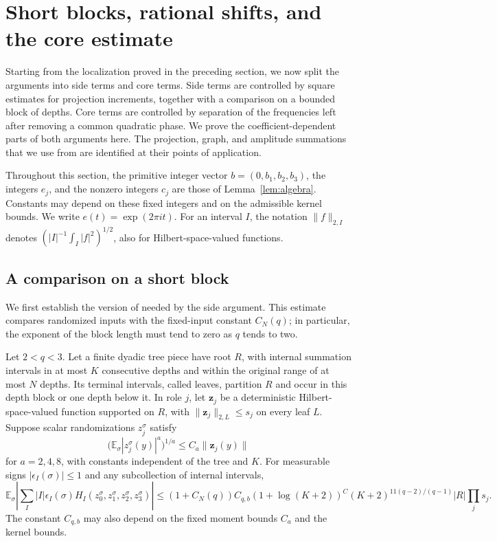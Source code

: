 \section{Short blocks, rational shifts, and the core estimate}
\label{sec:arithmetic}

Starting from the localization proved in the preceding section, we now
split the arguments into side terms and core terms.  Side terms are controlled by
square estimates for projection increments, together with a comparison on
a bounded block of depths.  Core terms are controlled by separation of
the frequencies left after removing a common quadratic phase.  We prove
the coefficient-dependent parts of both arguments here.  The projection,
graph, and amplitude summations that we use from \cite{H,V} are identified
at their points of application.

Throughout this section, the primitive integer vector
\(b=(0,b_1,b_2,b_3)\), the integers \(e_j\), and the nonzero integers
\(c_j\) are those of Lemma~\ref{lem:algebra}.  Constants may depend on
these fixed integers and on the admissible kernel bounds.  We write
\(e(t)=\exp(2\pi i t)\).  For an interval \(I\), the notation
\(\|f\|_{2,I}\) denotes \((|I|^{-1}\int_I|f|^2)^{1/2}\), also for
Hilbert-space-valued functions.

\subsection{A comparison on a short block}

We first establish the version of \cite[Lemma~7.2]{H} needed by the
side argument.  This estimate compares randomized inputs with the
fixed-input constant \(C_N(q)\); in particular, the exponent of the
block length must tend to zero as \(q\) tends to two.

\begin{proposition}\label{prop:short-block-b}
Let \(2<q<3\).  Let a finite dyadic tree piece have root \(R\), with
internal summation intervals in at most \(K\) consecutive depths and
within the original range of at most \(N\) depths.  Its terminal
intervals, called leaves, partition \(R\) and occur in this depth block
or one depth below it.  In role \(j\), let \(\mathbf z_j\) be a
deterministic Hilbert-space-valued function supported on \(R\), with
\(\|\mathbf z_j\|_{2,L}\le s_j\) on every leaf \(L\).
Suppose scalar randomizations \(z_j^\sigma\) satisfy
\[
 \bigl(\mathbb E_\sigma|z_j^\sigma(y)|^a\bigr)^{1/a}
 \le C_a\|\mathbf z_j(y)\|
\]
for \(a=2,4,8\), with constants independent of the tree and \(K\).
For measurable signs
\(|\epsilon_I(\sigma)|\le1\) and any subcollection of internal intervals,
\[
 \mathbb E_\sigma\left|
 \sum_I |I|\epsilon_I(\sigma)H_I(z_0^\sigma,z_1^\sigma,
                                  z_2^\sigma,z_3^\sigma)\right|
 \le (1+C_N(q))C_{q,b}(1+\log(K+2))^C
       (K+2)^{11(q-2)/(q-1)}|R|\prod_j s_j .
\]
The constant \(C_{q,b}\) may also depend on the fixed moment
bounds \(C_a\) and the kernel bounds.
\end{proposition}

